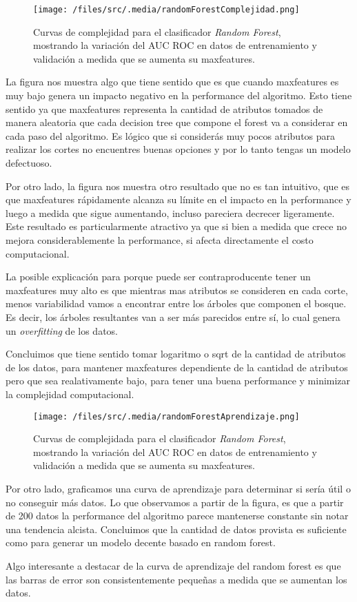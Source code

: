 \begin{figure}[!htbp]
    \centering
    \texttt{[image: /files/src/.media/randomForestComplejidad.png]}
    \caption{Curvas de complejidad para el clasificador \textit{Random Forest}, mostrando la variación del AUC ROC en datos de entrenamiento y validación a medida que se aumenta su maxfeatures.}
    \label{RFComplexity}
\end{figure}


La figura nos muestra algo que tiene sentido que es que cuando maxfeatures es muy bajo genera un impacto negativo en la performance del algoritmo. Esto tiene sentido ya que maxfeatures representa la cantidad de atributos tomados de manera aleatoria que cada decision tree que compone el forest va a considerar en cada paso del algoritmo. Es lógico que si considerás muy pocos atributos para realizar los cortes no encuentres buenas opciones y por lo tanto tengas un modelo defectuoso.

Por otro lado, la figura nos muestra otro resultado que no es tan intuitivo, que es que maxfeatures rápidamente alcanza su límite en el impacto en la performance y luego a medida que sigue aumentando, incluso pareciera decrecer ligeramente. Este resultado es particularmente atractivo ya que si bien a medida que crece no mejora considerablemente la performance, si afecta directamente el costo computacional. 

La posible explicación para porque puede ser contraproducente tener un maxfeatures muy alto es que mientras mas atributos se consideren en cada corte, menos variabilidad vamos a encontrar entre los árboles que componen el bosque. Es decir, los árboles resultantes van a ser más parecidos entre sí, lo cual genera un \textit{overfitting} de los datos.  

Concluimos que tiene sentido tomar logaritmo o sqrt de la cantidad de atributos de los datos, para mantener maxfeatures dependiente de la cantidad de atributos pero que sea realativamente bajo, para tener una buena performance y minimizar la complejidad computacional. 

\begin{figure}[!htbp]
    \centering
    \texttt{[image: /files/src/.media/randomForestAprendizaje.png]}
    \caption{Curvas de complejidada para el clasificador \textit{Random Forest}, mostrando la variación del AUC ROC en datos de entrenamiento y validación a medida que se aumenta su maxfeatures.}
    \label{RFLearning}
\end{figure}


Por otro lado, graficamos una curva de aprendizaje para determinar si sería útil o no conseguir más datos. Lo que observamos a partir de la figura, es que a partir de 200 datos la performance del algoritmo parece mantenerse constante sin notar una tendencia alcista. Concluimos que la cantidad de datos provista es suficiente como para generar un modelo decente basado en random forest. 

Algo interesante a destacar de la curva de aprendizaje del random forest es que las barras de error son consistentemente pequeñas a medida que se aumentan los datos. 